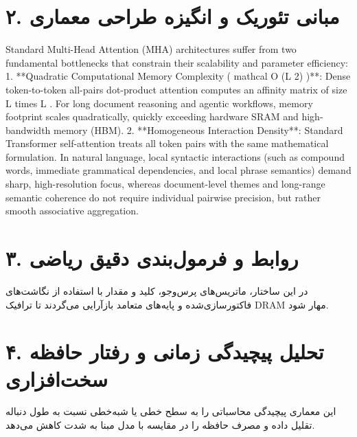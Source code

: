 \documentclass[12pt,a4paper]{article}
\begin{document}
\section*{۲. مبانی تئوریک و انگیزه طراحی معماری}
Standard Multi-Head Attention (MHA) architectures suffer from two fundamental bottlenecks that constrain their scalability and parameter efficiency: 1. **Quadratic Computational Memory Complexity ( mathcal O (L 2) )**: Dense token-to-token all-pairs dot-product attention computes an affinity matrix of size L times L . For long document reasoning and agentic workflows, memory footprint scales quadratically, quickly exceeding hardware SRAM and high-bandwidth memory (HBM). 2. **Homogeneous Interaction Density**: Standard Transformer self-attention treats all token pairs with the same mathematical formulation. In natural language, local syntactic interactions (such as compound words, immediate grammatical dependencies, and local phrase semantics) demand sharp, high-resolution focus, whereas document-level themes and long-range semantic coherence do not require individual pairwise precision, but rather smooth associative aggregation.

\section*{۳. روابط و فرمول‌بندی دقیق ریاضی}
در این ساختار، ماتریس‌های پرس‌وجو، کلید و مقدار با استفاده از نگاشت‌های فاکتورسازی‌شده و پایه‌های متعامد بازآرایی می‌گردند تا ترافیک DRAM مهار شود.

\section*{۴. تحلیل پیچیدگی زمانی و رفتار حافظه سخت‌افزاری}
این معماری پیچیدگی محاسباتی را به سطح خطی یا شبه‌خطی نسبت به طول دنباله تقلیل داده و مصرف حافظه را در مقایسه با مدل مبنا به شدت کاهش می‌دهد.
\end{document}
